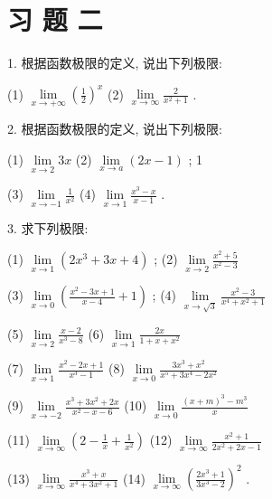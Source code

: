 \documentclass[10pt]{article}
\begin{document}
\section*{习 题 二}

1. 根据函数极限的定义, 说出下列极限:

(1) \(\mathop{\lim }\limits_{{x \rightarrow + \infty }}{\left( \frac{1}{2}\right) }^{x}\) (2) \(\mathop{\lim }\limits_{{x \rightarrow \infty }}\frac{2}{{x}^{2} + 1}\) .

2. 根据函数极限的定义, 说出下列极限:

(1) \(\mathop{\lim }\limits_{{x \rightarrow 2}}{3x}\) (2) \(\mathop{\lim }\limits_{{x \rightarrow a}}\left( {{2x} - 1}\right)\) ; 1

(3) \(\mathop{\lim }\limits_{{x \rightarrow - 1}}\frac{1}{{x}^{2}}\) (4) \(\mathop{\lim }\limits_{{x \rightarrow 1}}\frac{{x}^{3} - x}{x - 1}\) .

3. 求下列极限:

(1) \(\mathop{\lim }\limits_{{x \rightarrow 1}}\left( {2{x}^{3} + {3x} + 4}\right)\) ; (2) \(\mathop{\lim }\limits_{{x \rightarrow 2}}\frac{{x}^{2} + 5}{{x}^{2} - 3}\)

(3) \(\mathop{\lim }\limits_{{x \rightarrow 0}}\left( {\frac{{x}^{2} - {3x} + 1}{x - 4} + 1}\right)\) ; (4) \(\mathop{\lim }\limits_{{x \rightarrow \sqrt{3}}}\frac{{x}^{2} - 3}{{x}^{4} + {x}^{2} + 1}\)

(5) \(\mathop{\lim }\limits_{{x \rightarrow 2}}\frac{x - 2}{{x}^{3} - 8}\) (6) \(\mathop{\lim }\limits_{{x \rightarrow 1}}\frac{2x}{1 + x + {x}^{2}}\)

(7) \(\mathop{\lim }\limits_{{x \rightarrow 1}}\frac{{x}^{2} - {2x} + 1}{{x}^{3} - 1}\) (8) \(\mathop{\lim }\limits_{{x \rightarrow 0}}\frac{3{x}^{3} + {x}^{2}}{{x}^{5} + 3{x}^{4} - 2{x}^{2}}\)

(9) \(\mathop{\lim }\limits_{{x \rightarrow - 2}}\frac{{x}^{3} + 3{x}^{2} + {2x}}{{x}^{2} - x - 6}\) (10) \(\mathop{\lim }\limits_{{x \rightarrow 0}}\frac{{\left( x + m\right) }^{3} - {m}^{3}}{x}\)

(11) \(\mathop{\lim }\limits_{{x \rightarrow \infty }}\left( {2 - \frac{1}{x} + \frac{1}{{x}^{2}}}\right)\) (12) \(\mathop{\lim }\limits_{{x \rightarrow \infty }}\frac{{x}^{2} + 1}{2{x}^{2} + {2x} - 1}\)

(13) \(\mathop{\lim }\limits_{{x \rightarrow \infty }}\frac{{x}^{3} + x}{{x}^{4} + 3{x}^{2} + 1}\) (14) \(\mathop{\lim }\limits_{{x \rightarrow \infty }}{\left( \frac{2{x}^{3} + 1}{3{x}^{3} - 2}\right) }^{2}\) .
\end{document}
